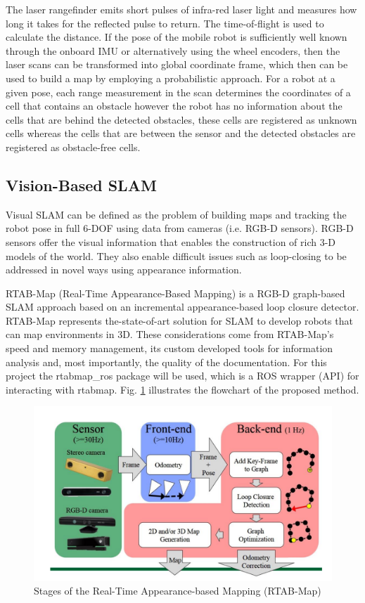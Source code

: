 \documentclass[10pt,journal,compsoc]{IEEEtran}
\begin{document}
The laser rangefinder emits short pulses of infra-red laser light and measures how long it takes for the reflected pulse to return. The time-of-flight is used to calculate the distance. If the pose of the mobile robot is sufficiently well known through the onboard IMU or alternatively using the wheel encoders, then the laser scans can be transformed into global coordinate frame, which then can be used to build a map by employing a probabilistic approach. For a robot at a given pose, each range measurement in the scan determines the coordinates of a cell that contains an obstacle however the robot has no information about the cells that are behind the detected obstacles, these cells are registered as unknown cells whereas the cells that are between the sensor and the detected obstacles are registered as obstacle-free cells.

\subsection{Vision-Based SLAM}

Visual SLAM can be defined as the problem of building maps and tracking the robot pose in full 6-DOF using data from cameras (i.e. RGB-D sensors). RGB-D sensors offer the visual information that enables the construction of rich 3-D models of the world. They also enable difficult issues such as loop-closing to be addressed in novel ways using appearance information.

RTAB-Map (Real-Time Appearance-Based Mapping) is a RGB-D graph-based SLAM approach based on an incremental appearance-based loop closure detector. RTAB-Map represents the-state-of-art solution for SLAM to develop robots that can map environments in 3D. These considerations come from RTAB-Map's speed and memory management, its custom developed tools for information analysis and, most importantly, the quality of the documentation. For this project the rtabmap\_ros package will be used, which is a ROS wrapper (API) for interacting with rtabmap. Fig. \ref{fig:rtab-flow} illustrates the flowchart of the proposed method.

\begin{figure}[thpb]
      \centering
      \includegraphics[width=\linewidth]{images/rtab-flow.png}
      \caption{Stages of the Real-Time Appearance-based Mapping (RTAB-Map)}
      \label{fig:rtab-flow}
\end{figure}
\end{document}
